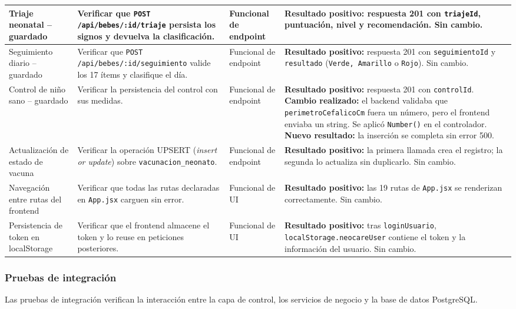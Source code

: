 \documentclass[12pt,letterpaper]{article}
\begin{document}
\begin{longtable}{p{}p{}p{}p{}}
Triaje neonatal -- guardado & Verificar que \texttt{POST /api/bebes/:id/triaje} persista los signos y devuelva la clasificación. & Funcional de endpoint & \textbf{Resultado positivo:} respuesta 201 con \texttt{triajeId}, puntuación, nivel y recomendación. Sin cambio.\\\hline
Seguimiento diario -- guardado & Verificar que \texttt{POST /api/bebes/:id/seguimiento} valide los 17 ítems y clasifique el día. & Funcional de endpoint & \textbf{Resultado positivo:} respuesta 201 con \texttt{seguimientoId} y \texttt{resultado} (\texttt{Verde, Amarillo} o \texttt{Rojo}). Sin cambio.\\\hline
Control de niño sano -- guardado & Verificar la persistencia del control con sus medidas. & Funcional de endpoint & \textbf{Resultado positivo:} respuesta 201 con \texttt{controlId}. \textbf{Cambio realizado:} el backend validaba que \texttt{perimetroCefalicoCm} fuera un número, pero el frontend enviaba un string. Se aplicó \texttt{Number()} en el controlador. \textbf{Nuevo resultado:} la inserción se completa sin error 500.\\\hline
Actualización de estado de vacuna & Verificar la operación UPSERT (\textit{insert or update}) sobre \texttt{vacunacion\_neonato}. & Funcional de endpoint & \textbf{Resultado positivo:} la primera llamada crea el registro; la segunda lo actualiza sin duplicarlo. Sin cambio.\\\hline
Navegación entre rutas del frontend & Verificar que todas las rutas declaradas en \texttt{App.jsx} carguen sin error. & Funcional de UI & \textbf{Resultado positivo:} las 19 rutas de \texttt{App.jsx} se renderizan correctamente. Sin cambio.\\\hline
Persistencia de token en localStorage & Verificar que el frontend almacene el token y lo reuse en peticiones posteriores. & Funcional de UI & \textbf{Resultado positivo:} tras \texttt{loginUsuario}, \texttt{localStorage.neocareUser} contiene el token y la información del usuario. Sin cambio.\\\bottomrule
\end{longtable}

\subsubsection{Pruebas de integración}

Las pruebas de integración verifican la interacción entre la capa de control, los servicios de negocio y la base de datos PostgreSQL.
\end{document}
